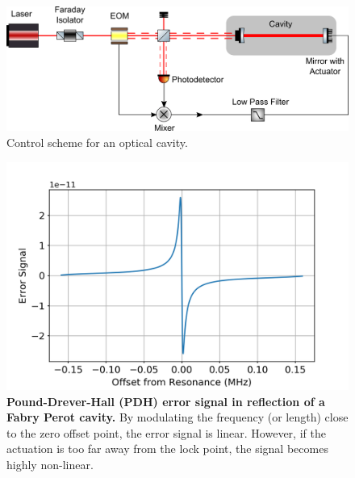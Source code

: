 		\begin{figure}[h]
		\centering
		\includegraphics[width=.75 \textwidth]{../Figures/FP_Control.png}
		\caption{Control scheme for an optical cavity.}
		\label{fig:FPControl}
		\end{figure}
	
		\begin{figure}[h]
		\centering
		\includegraphics[width=.75 \textwidth]{../Figures/PDH_Err.png}
		\caption[Error signal in reflection]{\textbf{Pound-Drever-Hall (PDH) error signal in reflection of a Fabry Perot cavity.}  By modulating the frequency (or length) close to the zero offset point, the error signal is linear.  However, if the actuation is too far away from the lock point, the signal becomes highly non-linear. }
		\label{fig:FP_err}
		\end{figure}
	
		
